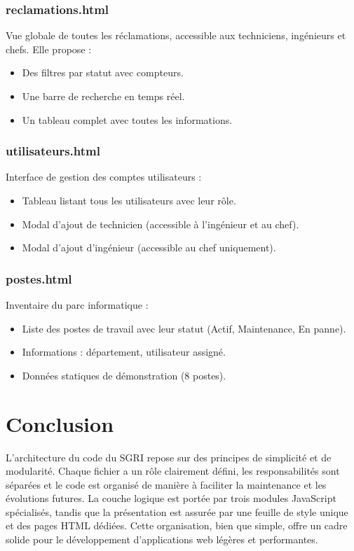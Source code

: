 \documentclass[12pt,a4paper,twoside]{report}
\begin{document}
\subsubsection{reclamations.html}
Vue globale de toutes les réclamations, accessible aux techniciens, ingénieurs et chefs. Elle propose :
\begin{itemize}
    \item Des filtres par statut avec compteurs.
    \item Une barre de recherche en temps réel.
    \item Un tableau complet avec toutes les informations.
\end{itemize}

\subsubsection{utilisateurs.html}
Interface de gestion des comptes utilisateurs :
\begin{itemize}
    \item Tableau listant tous les utilisateurs avec leur rôle.
    \item Modal d'ajout de technicien (accessible à l'ingénieur et au chef).
    \item Modal d'ajout d'ingénieur (accessible au chef uniquement).
\end{itemize}

\subsubsection{postes.html}
Inventaire du parc informatique :
\begin{itemize}
    \item Liste des postes de travail avec leur statut (Actif, Maintenance, En panne).
    \item Informations : département, utilisateur assigné.
    \item Données statiques de démonstration (8 postes).
\end{itemize}

\section{Conclusion}

L'architecture du code du SGRI repose sur des principes de simplicité et de modularité. Chaque fichier a un rôle clairement défini, les responsabilités sont séparées et le code est organisé de manière à faciliter la maintenance et les évolutions futures. La couche logique est portée par trois modules JavaScript spécialisés, tandis que la présentation est assurée par une feuille de style unique et des pages HTML dédiées. Cette organisation, bien que simple, offre un cadre solide pour le développement d'applications web légères et performantes.
\end{document}
